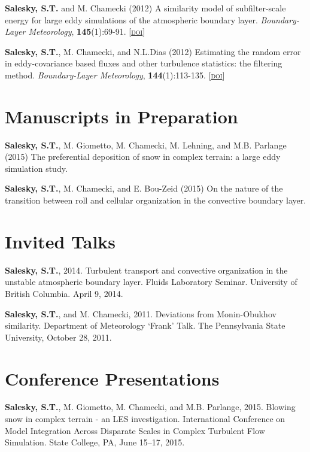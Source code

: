 \documentclass[11pt,letterpaper]{article}
\begin{document}
\textbf{Salesky, S.T.} and M. Chamecki  (2012) A similarity model of subfilter-scale energy for large eddy simulations of the atmospheric boundary layer. \textit{Boundary-Layer Meteorology}, \textbf{145}(1):69-91. [\href{http://doi.org/10.1007/s10546-011-9618-0}{\textsc{doi}}]

\textbf{Salesky, S.T.}, M. Chamecki, and N.L.Dias (2012) Estimating the random error in eddy-covariance based fluxes and other turbulence statistics: the filtering method. \textit{Boundary-Layer Meteorology}, \textbf{144}(1):113-135. [\href{http://doi.org/10.1007/s10546-012-9710-0}{\textsc{doi}}]

\section*{Manuscripts in Preparation} 
\textbf{Salesky, S.T.}, M. Giometto, M. Chamecki, M. Lehning, and M.B. Parlange (2015) The
preferential deposition of snow in complex terrain: a large eddy simulation
study. 

\textbf{Salesky, S.T.}, M. Chamecki, and E. Bou-Zeid (2015) On the nature of the transition
between roll and cellular organization in the convective boundary layer.

\section*{Invited Talks} 
\textbf{Salesky, S.T.}, 2014. Turbulent transport and convective organization in the unstable atmospheric boundary layer. Fluids Laboratory Seminar. University of British Columbia. April 9, 2014. 

\textbf{Salesky, S.T.}, and M. Chamecki, 2011. Deviations from Monin-Obukhov similarity. Department of Meteorology `Frank' Talk. The Pennsylvania State University, October 28, 2011. 

\section*{Conference Presentations} 
\textbf{Salesky, S.T.}, M. Giometto, M. Chamecki, and M.B. Parlange, 2015. Blowing snow in complex terrain - an LES investigation. International Conference on Model Integration Across Disparate Scales in Complex Turbulent Flow Simulation. State College, PA, June 15--17, 2015. 
\end{document}
